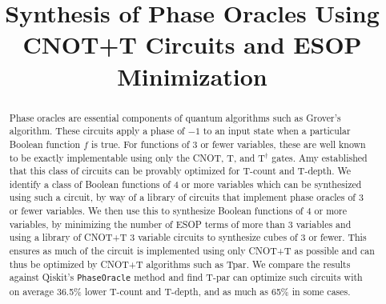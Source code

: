 \documentclass[conference]{IEEEtran}
\begin{document}
\title{Synthesis of Phase Oracles Using CNOT+T Circuits and ESOP Minimization}
\author{
    \IEEEauthorblockN{\phantom{David Clarino}}
    \IEEEauthorblockA{\phantom{Ritsumeikan University} \\
      \phantom{dclarino@fc.ritsumei.ac.jp}}
    \and 
    \IEEEauthorblockN{\phantom{Chitranshu Arya}}
    \IEEEauthorblockA{\phantom{Netaji Subhas} \\
      \phantom{University of Technology} \\
      \phantom{chitranshu.arya.ug22@nsut.ac.in}}
    \and
    \IEEEauthorblockN{\phantom{Shigeru Yamashita}}
    \IEEEauthorblockA{\phantom{Ritsumeikan University} \\
      \phantom{ger@cs.ritsumei.ac.jp}}
    \and
    \IEEEauthorblockN{\phantom{Zanhe Qi}}
    \IEEEauthorblockA{\phantom{Ritsumeikan University} \\ \phantom{goose@ngc.is.ritsumei.ac.jp}}
}

\maketitle

\begin{abstract}
  Phase oracles are essential components of quantum algorithms such as Grover's algorithm. These circuits apply a phase of $-1$ to an input state when a particular Boolean function $f$ is true. For functions of 3 or fewer variables, these are well known to be exactly implementable using only the CNOT, T, and T$^\dagger$ gates. Amy established that this class of circuits can be provably optimized for T-count and T-depth. We identify a class of Boolean functions of 4 or more variables which can be synthesized using such a circuit, by way of a library of circuits that implement phase oracles of 3 or fewer variables. We then use this to synthesize Boolean functions of 4 or more variables, by minimizing the number of ESOP terms of more than 3 variables and using a library of CNOT+T 3 variable circuits to synthesize cubes of 3 or fewer. This ensures as much of the circuit is implemented using only CNOT+T as possible and can thus be optimized by CNOT+T algorithms such as Tpar. We compare the results against Qiskit's \texttt{PhaseOracle} method and find T-par can optimize such circuits with on average 36.5\% lower T-count and T-depth, and as much as 65\% in some cases.
\end{abstract}
\end{document}
